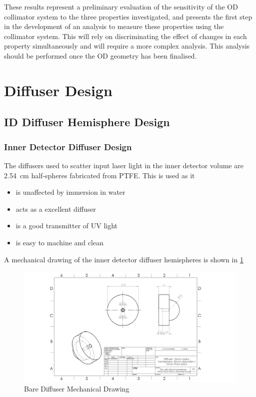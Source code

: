 \documentclass[a4paper,11pt]{article}
\begin{document}
These results represent a preliminary evaluation of the sensitivity of the OD collimator system to the three properties investigated, and presents the first step in the development of an analysis to measure these properties using the collimator system. This will rely on discriminating the effect of changes in each property simultaneously and will require a more complex analysis. This analysis should be performed once the OD geometry has been finalised.

\section{Diffuser Design}\label{sec:diffuser}
\subsection{ID Diffuser Hemisphere Design}
\subsubsection{Inner Detector Diffuser Design}

The diffusers used to scatter input laser light in the inner detector volume are 2.54~cm half-spheres fabricated from PTFE. This is used as it
\begin{itemize}
\item is unaffected by immersion in water
\item acts as a excellent diffuser
\item is a good transmitter of UV light
\item is easy to machine and clean
\end{itemize}

A mechanical drawing of the inner detector diffuser hemispheres is shown in \cref{fig:Bare_Diffuser_Mechanical}

\begin{figure}
    \centering
    \includegraphics[width=\textwidth]{BareDiffuser.PNG}
    \caption{Bare Diffuser Mechanical Drawing}
    \label{fig:Bare_Diffuser_Mechanical}
\end{figure}
\end{document}
